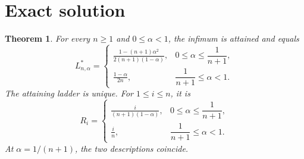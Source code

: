 \documentclass[11pt]{article}
\newtheorem{theorem}{Theorem}
\begin{document}
\section{Exact solution}

\begin{theorem}
For every \(n\geq1\) and \(0\leq\alpha<1\), the infimum is attained and equals
\[
 L^*_{n,\alpha}=
 \begin{cases}
 \displaystyle
 \frac{1-(n+1)\alpha^2}{2(n+1)(1-\alpha)},
 &0\leq\alpha\leq\dfrac1{n+1},\\[7pt]
 \displaystyle
 \frac{1-\alpha}{2n},
 &\dfrac1{n+1}\leq\alpha<1.
 \end{cases}
\]
The attaining ladder is unique.  For \(1\leq i\leq n\), it is
\[
 R_i=
 \begin{cases}
 \displaystyle\frac{i}{(n+1)(1-\alpha)},
 &0\leq\alpha\leq\dfrac1{n+1},\\[7pt]
 \displaystyle\frac{i}{n},
 &\dfrac1{n+1}\leq\alpha<1.
 \end{cases}
\]
At \(\alpha=1/(n+1)\), the two descriptions coincide.
\end{theorem}
\end{document}
